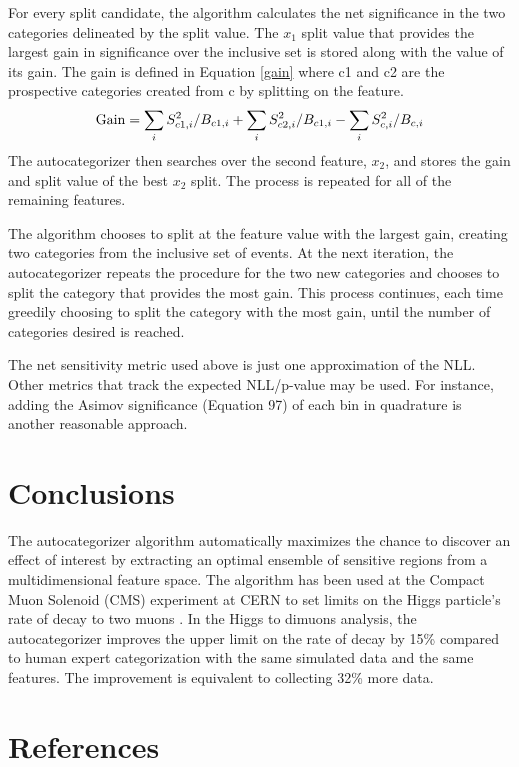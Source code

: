 \documentclass[review]{elsarticle}
\begin{document}
For every split candidate, the algorithm calculates the net significance in the two categories delineated by the split value. The $x_1$ split value that provides the largest gain in significance over the inclusive set is stored along with the value of its gain. The gain is defined in Equation \ref{gain} where c1 and c2 are the prospective categories created from c by splitting on the feature.
\begin{equation}
{\rm Gain} = \sum_{i}S_{c1,i}^{2}/B_{c1,i} + \sum_{i}S_{c2,i}^{2}/B_{c1,i} - \sum_{i}S_{c,i}^{2}/B_{c,i} 
\label{gain}
\end{equation}
The autocategorizer then searches over the second feature, $x_2$, and stores the gain and split value of the best $x_2$ split. The process is repeated for all of the remaining features.

The algorithm chooses to split at the feature value with the largest gain, creating two
categories from the inclusive set of events. At the next iteration, the autocategorizer repeats the procedure for the two new
categories and chooses to split the category that provides the most gain. This process continues, each time greedily choosing to
split the category with the most gain, until the number of categories desired is reached.

The net sensitivity metric used above is just one approximation of the NLL. Other metrics that track the expected NLL/p-value may be used. For instance, adding the Asimov significance \cite{cowan}(Equation 97) of each bin in quadrature is another reasonable approach.

\section{Conclusions}
The autocategorizer algorithm automatically maximizes the chance to discover an effect of interest by extracting an optimal ensemble of sensitive regions from a multidimensional feature space. The algorithm has been used at the Compact Muon Solenoid (CMS) experiment at CERN to set limits on the Higgs particle's rate of decay to two muons \cite{cmshiggsmumu2017}. In the Higgs to dimuons analysis, the autocategorizer improves the upper limit on the rate of decay by 15\% compared to human expert categorization with the same simulated data and the same features. The improvement is equivalent to collecting 32\% more data.

\section*{References}


\end{document}
